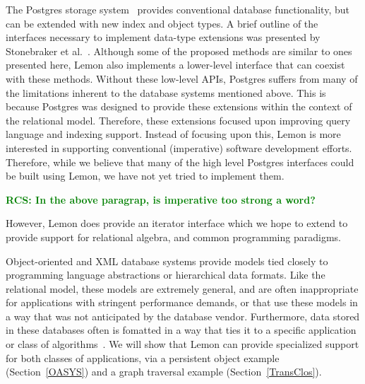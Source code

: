 \documentclass[letterpaper,twocolumn,english]{article}
\newcommand{\yad}{Lemon\xspace}
\newcommand{\rcs}[1]{\textcolor{green}{\bf RCS: #1}}
\begin{document}
The Postgres storage system~\cite{postgres} provides conventional
database functionality, but can be extended with new index and object
types.  A brief outline of the interfaces necessary to implement data-type extensions was presented by Stonebraker et al.~\cite{newTypes}.
Although some of the proposed methods are similar to ones presented
here, \yad also implements a lower-level interface that can coexist
with these methods.  Without these low-level APIs, Postgres
suffers from many of the limitations inherent to the database systems
mentioned above.  This is because Postgres was designed to provide 
these extensions within the context of the relational model.  
Therefore, these extensions focused upon improving query language 
and indexing support.  Instead of focusing upon this, \yad is more 
interested in supporting conventional (imperative) software development
efforts.  Therefore, while we believe that many of the high level 
Postgres interfaces could be built using \yad, we have not yet tried 
to implement them.

\rcs{In the above paragrap, is imperative too strong a word?}


However, \yad does provide an iterator interface which we hope to
extend to provide support for relational algebra, and common
programming paradigms.

Object-oriented and XML database systems provide models tied closely
to programming language abstractions or hierarchical data formats.
Like the relational model, these models are extremely general, and are
often inappropriate for applications with stringent performance
demands, or that use these models in a way that was not anticipated by
the database vendor.  Furthermore, data stored in these databases
often is fomatted in a way that ties it to a specific application or
class of algorithms~\cite{lamb}.  We will show that \yad can provide 
specialized support for both classes of applications, via a persistent 
object example (Section~\ref{OASYS}) and a graph traversal example 
(Section~\ref{TransClos}).

\end{document}
